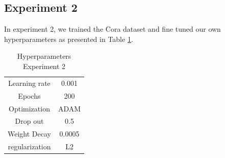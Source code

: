 \subsection{Experiment 2}
In experiment 2, we trained the Cora dataset and fine tuned our own hyperparameters as presented in Table \ref{tab:hyperparameters2}.

\begin {table}[ht]
\caption {Hyperparameters Experiment 2} \label{tab:hyperparameters2} 
  \begin{center}
    \begin{tabular}{|c|c|}
    \hline
    Learning rate     & 0.001 \\ 
    Epochs            & 200  \\ 
    Optimization      & ADAM \\
    Drop out          & 0.5   \\
    Weight Decay      & 0.0005 \\
    regularization    & L2    \\
    \hline
    \end{tabular}
  \end{center}
\end{table}